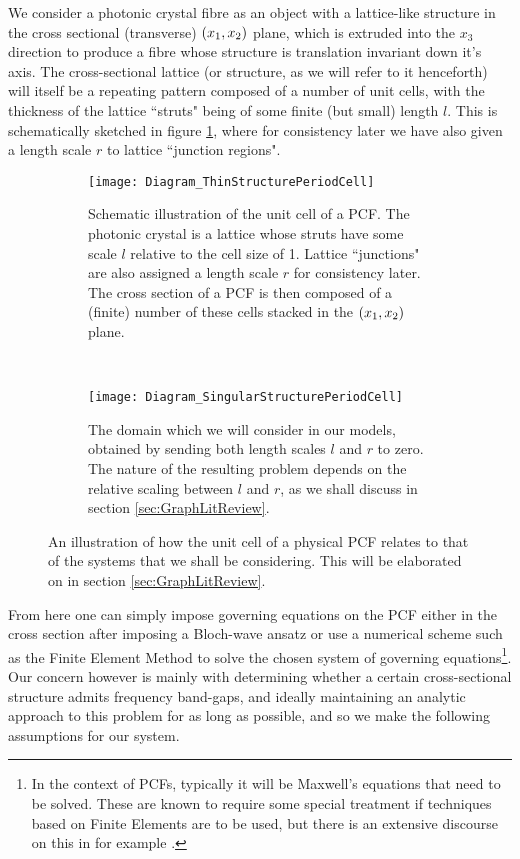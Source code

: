 We consider a photonic crystal fibre as an object with a lattice-like structure in the cross sectional (transverse) $\left( x_1,x_2 \right)$ plane, which is extruded into the $x_3$ direction to produce a fibre whose structure is translation invariant down it's axis.
The cross-sectional lattice (or structure, as we will refer to it henceforth) will itself be a repeating pattern composed of a number of unit cells, with the thickness of the lattice ``struts" being of some finite (but small) length $l$.
This is schematically sketched in figure \ref{fig:Diagram_ThinStructurePeriodCell}, where for consistency later we have also given a length scale $r$ to lattice ``junction regions".
\begin{figure}[b!]
	\centering
	\begin{subfigure}[t]{0.45\textwidth}
		\centering
		\texttt{[image: Diagram\_ThinStructurePeriodCell]}
		\caption{\label{fig:Diagram_ThinStructurePeriodCell} Schematic illustration of the unit cell of a PCF. The photonic crystal is a lattice whose struts have some scale $l$ relative to the cell size of 1. Lattice ``junctions" are also assigned a length scale $r$ for consistency later. The cross section of a PCF is then composed of a (finite) number of these cells stacked in the $\left( x_1,x_2 \right)$ plane.}
	\end{subfigure}
	~
	\begin{subfigure}[t]{0.45\textwidth}
		\centering
		\texttt{[image: Diagram\_SingularStructurePeriodCell]}
		\caption{\label{fig:Diagram_SingularStructurePeriodCell} The domain which we will consider in our models, obtained by sending both length scales $l$ and $r$ to zero. The nature of the resulting problem depends on the relative scaling between $l$ and $r$, as we shall discuss in section \ref{sec:GraphLitReview}.}
	\end{subfigure}
	\caption{\label{fig:ThinToSingularStructure} An illustration of how the unit cell of a physical PCF relates to that of the systems that we shall be considering. This will be elaborated on in section \ref{sec:GraphLitReview}.}
\end{figure}
From here one can simply impose governing equations on the PCF either in the cross section after imposing a Bloch-wave ansatz or use a numerical scheme such as the Finite Element Method to solve the chosen system of governing equations\footnote{In the context of PCFs, typically it will be Maxwell's equations that need to be solved. These are known to require some special treatment if techniques based on Finite Elements are to be used, but there is an extensive discourse on this in for example \cite{monk2003finite}.}.
Our concern however is mainly with determining whether a certain cross-sectional structure admits frequency band-gaps, and ideally maintaining an analytic approach to this problem for as long as possible, and so we make the following assumptions for our system.

